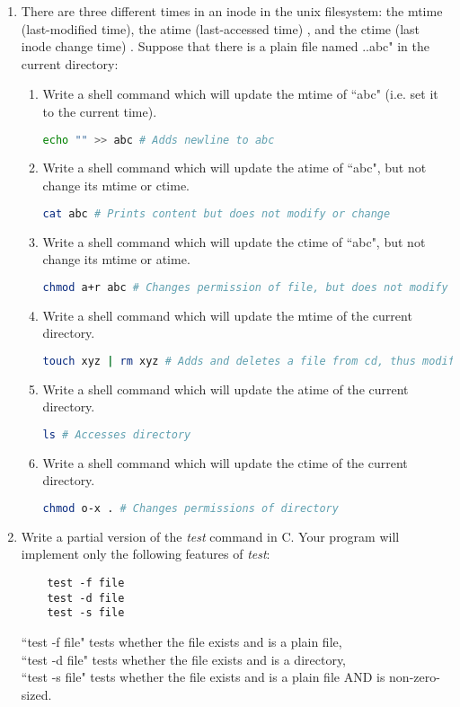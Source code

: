 \documentclass[11pt]{article}
\begin{document}
\begin{enumerate}
	\newpage
	\item There are three different times in an inode in the unix filesystem: the mtime (last-modified time), the atime (last-accessed time) , and the ctime (last inode change time) . Suppose that there is a plain file named ..abc" in the current directory:
	\begin{enumerate}
		\item Write a shell command which will update the mtime of ``abc" (i.e. set it to the current time).
		\begin{lstlisting}[language=sh]
			echo "" >> abc # Adds newline to abc\end{lstlisting}
		\item Write a shell command which will update the atime of ``abc", but not change its mtime or ctime.
		\begin{lstlisting}[language=sh]
			cat abc # Prints content but does not modify or change\end{lstlisting}
		\item Write a shell command which will update the ctime of ``abc", but not change its mtime or atime.
		\begin{lstlisting}[language=sh]
			chmod a+r abc # Changes permission of file, but does not modify or access\end{lstlisting}
		\item Write a shell command which will update the mtime of the current directory.
		\begin{lstlisting}[language=sh]
			touch xyz | rm xyz # Adds and deletes a file from cd, thus modifying it\end{lstlisting}
		\item Write a shell command which will update the atime of the current directory.
		\begin{lstlisting}[language=sh]
			ls # Accesses directory\end{lstlisting}			
		\item Write a shell command which will update the ctime of the current directory.
		\begin{lstlisting}[language=sh]
			chmod o-x . # Changes permissions of directory\end{lstlisting}
	\end{enumerate}

	\newpage
	\item Write a partial version of the \textit{test} command in C. Your program will implement only the following features of \textit{test}:\begin{Verbatim}
	test -f file 
	test -d file 
	test -s file
	\end{Verbatim}
	``test -f file" tests whether the file exists and is a plain file,\\
	``test -d file" tests whether the file exists and is a directory,\\
	``test -s file" tests whether the file exists and is a plain file AND is non-zero-sized.
		
		

\end{enumerate}
\end{document}
